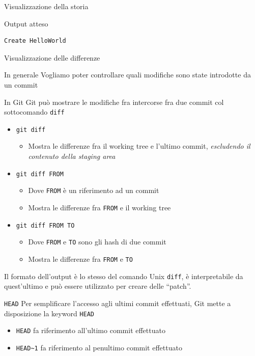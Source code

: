 \documentclass[xcolor=dvipsnames,presentation]{beamer}
\begin{document}
\begin{frame}{Visualizzazione della storia}
\begin{block}{Output atteso}
\begin{Verbatim}[fontsize=\tiny]
      Create HelloWorld
		\end{Verbatim}
	\end{block}
\end{frame}

\begin{frame}{Visualizzazione delle differenze}
	\begin{block}{In generale}
		Vogliamo poter controllare quali modifiche sono state introdotte da un commit
	\end{block}
	\begin{block}{In Git}
		Git può mostrare le modifiche fra intercorse fra due commit col sottocomando \texttt{diff}
		\begin{itemize}
			\item \texttt{git diff}
			\begin{itemize}
				\item Mostra le differenze fra il working tree e l'ultimo commit, \textit{escludendo il contenuto della staging area}
			\end{itemize}
			\item \texttt{git diff FROM}
			\begin{itemize}
				\item Dove \texttt{FROM} è un riferimento ad un commit
				\item Mostra le differenze fra \texttt{FROM} e il working tree
			\end{itemize}
			\item \texttt{git diff FROM TO}
			\begin{itemize}
				\item Dove \texttt{FROM} e \texttt{TO} sono gli hash di due commit
				\item Mostra le differenze fra \texttt{FROM} e \texttt{TO}
			\end{itemize}
		\end{itemize}
		Il formato dell'output è lo stesso del comando Unix \texttt{diff}, è interpretabile da quest'ultimo e può essere utilizzato per creare delle ``patch''.
	\end{block}
	\begin{block}{\texttt{HEAD}}
		Per semplificare l'accesso agli ultimi commit effettuati, Git mette a disposizione la keyword \texttt{HEAD}
		\begin{itemize}
			\item \texttt{HEAD} fa riferimento all'ultimo commit effettuato
			\item \texttt{HEAD\textasciitilde{}1} fa riferimento al penultimo commit effettuato

\end{itemize}
\end{block}
\end{frame}
\end{document}
